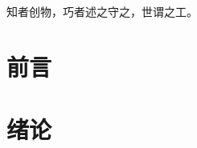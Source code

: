 \documentclass[12pt,a4paper]{book}
\newcommand{\notebody}{
	\chapter*{前言}
	

	\chapter{绪论}
	

	


}
\begin{document}
	

	\newpage

	\thispagestyle{empty}
	\vspace*{\fill}
	\begin{center}
		{\kaishu\fontsize{18}{28}\selectfont 知者创物，巧者述之守之，世谓之工。}
	\end{center}
	\vfill
	\newpage

	\pagestyle{mainstyle}

	\setcounter{tocdepth}{3}

	\tableofcontents

	\setcounter{page}{0}
	\thispagestyle{empty}
	\newpage
	\notebody
\end{document}
